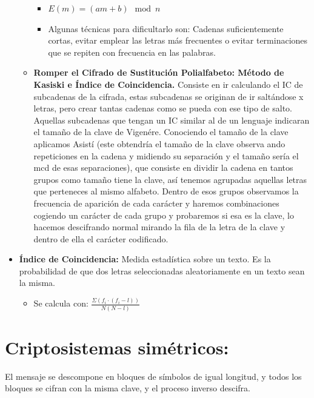 \documentclass[12pt, twoside, openright]{report} %
\begin{document}
\begin{itemize}
\begin{itemize}
      \begin{itemize}
      \item $E(m)=(am+b) \mod n$
        
      \item Algunas técnicas para dificultarlo son: Cadenas suficientemente
        cortas, evitar emplear las letras más frecuentes o evitar
        terminaciones que se repiten con frecuencia en las palabras.
        
      \end{itemize}
    \item \textbf{Romper el Cifrado de Sustitución Polialfabeto: Método de Kasiski e Índice de Coincidencia.} 
      Consiste en ir calculando el IC de subcadenas de la
      cifrada, estas subcadenas se originan de ir saltándose x letras,
      pero crear tantas cadenas como se pueda con ese tipo de salto.
      Aquellas subcadenas que tengan un IC similar al de un lenguaje
      indicaran el tamaño de la clave de Vigenére. Conociendo el tamaño
      de la clave aplicamos Asistí (este obtendría el tamaño de la
      clave observa ando repeticiones en la cadena y midiendo su
      separación y el tamaño sería el mcd de esas separaciones), que
      consiste en dividir la cadena en tantos grupos como tamaño tiene
      la clave, así tenemos agrupadas aquellas letras que perteneces al
      mismo alfabeto. Dentro de esos grupos observamos la frecuencia de
      aparición de cada carácter y haremos combinaciones cogiendo un
      carácter de cada grupo y probaremos si esa es la clave, lo hacemos
      descifrando normal mirando la fila de la letra de la clave y
      dentro de ella el carácter codificado.
      
    \end{itemize}
	\pagebreak
  \item \textbf{Índice de Coincidencia:} Medida estadística sobre un texto.
    Es la probabilidad de que dos letras seleccionadas aleatoriamente en
    un texto sean la misma.
    

    \begin{itemize}
    \item Se calcula con: $\frac{\Sigma(f_i \cdot (f_i - l))}{N(N-l)}$
      
    \end{itemize}
  \end{itemize}

  
  \section{Criptosistemas simétricos:} El mensaje se descompone en
  bloques de símbolos de igual longitud, y todos los bloques se cifran
  con la misma clave, y el proceso inverso descifra.
  
\end{document}
